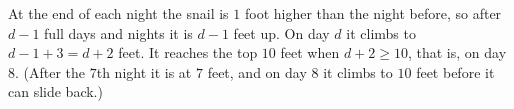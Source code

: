 At the end of each night the snail is $1$ foot higher than the night before, so after $d-1$ full days and nights it is $d-1$ feet up. On day $d$ it climbs to $d-1+3=d+2$ feet. It reaches the top $10$ feet when $d+2\ge10$, that is, on day $\boxed{8}$. (After the $7$th night it is at $7$ feet, and on day $8$ it climbs to $10$ feet before it can slide back.)
